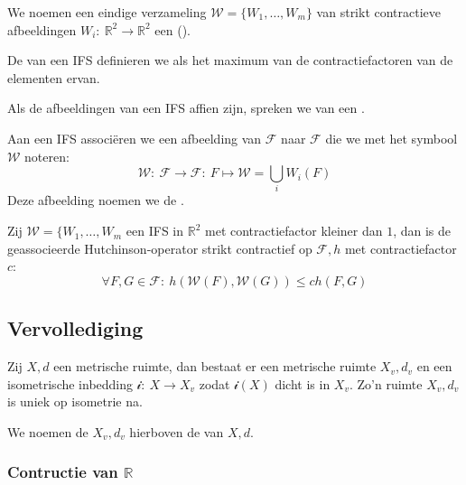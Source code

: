 \documentclass[main.tex]{subfiles}
\begin{document}
\begin{de}
  We noemen een eindige verzameling $\mathcal{W} = \{ W_{1}, \dotsc, W_{m}\}$ van strikt contractieve afbeeldingen $W_{i}:\ \mathbb{R}^{2}\rightarrow \mathbb{R}^{2}$ een  ().
\end{de}

\begin{de}
  De  van een IFS definieren we als het maximum van de contractiefactoren van de elementen ervan.
\end{de}

\begin{de}
  Als de afbeeldingen van een IFS affien zijn, spreken we van een .
\end{de}

\begin{de}
  Aan een IFS associ\"eren we een afbeelding van $\mathcal{F}$ naar $\mathcal{F}$ die we met het symbool $\mathcal{W}$ noteren:
  \[ \mathcal{W}:\ \mathcal{F} \rightarrow \mathcal{F}:\ F \mapsto \mathcal{W} = \bigcup_{i}W_{i}(F) \]
  Deze afbeelding noemen we de .
\end{de}

\begin{bpr}
  Zij $\mathcal{W} = \{ W_{1}, \dotsc, W_{m}$ een IFS in $\mathbb{R}^{2}$ met contractiefactor kleiner dan $1$, dan is de geassocieerde Hutchinson-operator strikt contractief op $\mathcal{F},h$ met contractiefactor $c$:
  \[ \forall F,G \in \mathcal{F}:\ h\left(\mathcal{W}(F), \mathcal{W}(G)\right) \le c h(F,G) \]
\end{bpr}


\subsection{Vervollediging}
\label{sec:vervollediging}

\begin{bst}
  Zij $X,d$ een metrische ruimte, dan bestaat er een metrische ruimte $X_{v},d_{v}$ en een isometrische inbedding $\mathcal{i}:\ X \rightarrow X_{v}$ zodat $\mathcal{i}(X)$ dicht is in $X_{v}$.
  Zo'n ruimte $X_{v},d_{v}$ is uniek op isometrie na.
\end{bst}

\begin{de}
  We noemen de $X_{v},d_{v}$ hierboven de  van $X,d$.
\end{de}

\subsubsection{Contructie van $\mathbb{R}$}
\label{sec:contr-van-mathbbr}

\end{document}
